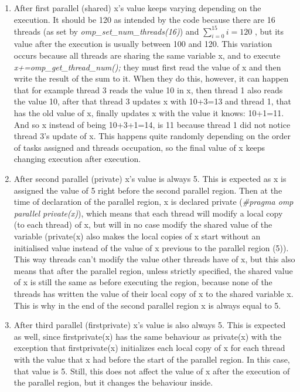 \documentclass[12]{article}
\begin{document}
\begin{enumerate}
    \item After first parallel (shared) x's value keeps varying depending on the execution. It should be 120 as intended by the code because there are 16 threads (as set by \textit{omp\_set\_num\_threads(16)}) and $\sum_{i=0}^{15} i = 120$ , but its value after the execution is usually between 100 and 120. This variation occurs because all threads are sharing the same variable x, and to execute \textit{x+=omp\_get\_thread\_num();} they must first read the value of x and then write the result of the sum to it. When they do this, however, it can happen that for example thread 3 reads the value 10 in x, then thread 1 also reads the value 10, after that thread 3 updates x with 10+3=13 and thread 1, that has the old value of x, finally updates x with the value it knows: 10+1=11. And so x instead of being 10+3+1=14, is 11 because thread 1 did not notice thread 3's update of x. This happens quite randomly depending on the order of tasks assigned and threads occupation, so the final value of x keeps changing execution after execution.
    \item After second parallel (private) x's value is always 5. This is expected as x is assigned the value of 5 right before the second parallel region. Then at the time of declaration of the parallel region, x is declared private (\textit{\#pragma omp parallel private(x)}), which means that each thread will modify a local copy (to each thread) of x, but will in no case modify the shared value of the variable (private(x) also makes the local copies of x start without an initialised value instead of the value of x previous to the parallel region (5)). This way threads can't modify the value other threads have of x, but this also means that after the parallel region, unless strictly specified, the shared value of x is still the same as before executing the region, because none of the threads has written the value of their local copy of x to the shared variable x. This is why in the end of the second parallel region x is always equal to 5.
    \item After third parallel (firstprivate) x's value is also always 5. This is expected as well, since firstprivate(x) has the same behaviour as private(x) with the exception that firstprivate(x) initializes each local copy of x for each thread with the value that x had before the start of the parallel region. In this case, that value is 5. Still, this does not affect the value of x after the execution of the parallel region, but it changes the behaviour inside.

\end{enumerate}
\end{document}
